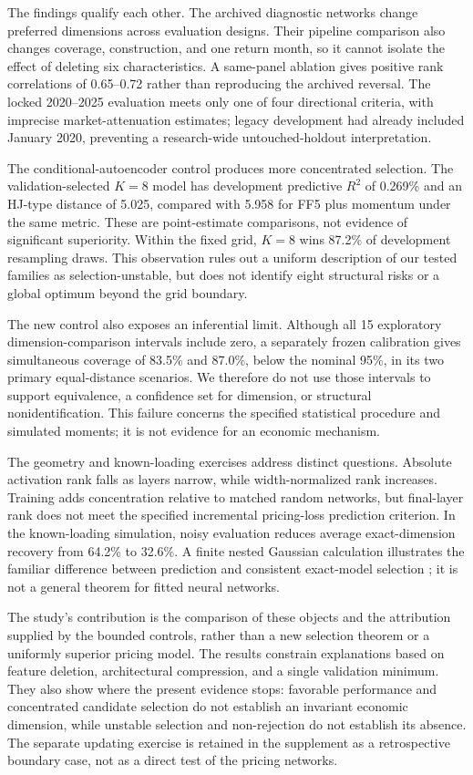 The findings qualify each other. The archived diagnostic networks change preferred dimensions across evaluation designs. Their pipeline comparison also changes coverage, construction, and one return month, so it cannot isolate the effect of deleting six characteristics. A same-panel ablation gives positive rank correlations of 0.65--0.72 rather than reproducing the archived reversal. The locked 2020--2025 evaluation meets only one of four directional criteria, with imprecise market-attenuation estimates; legacy development had already included January 2020, preventing a research-wide untouched-holdout interpretation.

The conditional-autoencoder control produces more concentrated selection. The validation-selected $K=8$ model has development predictive $R^2$ of 0.269\% and an HJ-type distance of 5.025, compared with 5.958 for FF5 plus momentum under the same metric. These are point-estimate comparisons, not evidence of significant superiority. Within the fixed grid, $K=8$ wins 87.2\% of development resampling draws. This observation rules out a uniform description of our tested families as selection-unstable, but does not identify eight structural risks or a global optimum beyond the grid boundary.

The new control also exposes an inferential limit. Although all 15 exploratory dimension-comparison intervals include zero, a separately frozen calibration gives simultaneous coverage of 83.5\% and 87.0\%, below the nominal 95\%, in its two primary equal-distance scenarios. We therefore do not use those intervals to support equivalence, a confidence set for dimension, or structural nonidentification. This failure concerns the specified statistical procedure and simulated moments; it is not evidence for an economic mechanism.

The geometry and known-loading exercises address distinct questions. Absolute activation rank falls as layers narrow, while width-normalized rank increases. Training adds concentration relative to matched random networks, but final-layer rank does not meet the specified incremental pricing-loss prediction criterion. In the known-loading simulation, noisy evaluation reduces average exact-dimension recovery from 64.2\% to 32.6\%. A finite nested Gaussian calculation illustrates the familiar difference between prediction and consistent exact-model selection \citep{shao1993cv,yang2007cv}; it is not a general theorem for fitted neural networks.

The study's contribution is the comparison of these objects and the attribution supplied by the bounded controls, rather than a new selection theorem or a uniformly superior pricing model. The results constrain explanations based on feature deletion, architectural compression, and a single validation minimum. They also show where the present evidence stops: favorable performance and concentrated candidate selection do not establish an invariant economic dimension, while unstable selection and non-rejection do not establish its absence. The separate updating exercise is retained in the supplement as a retrospective boundary case, not as a direct test of the pricing networks.

